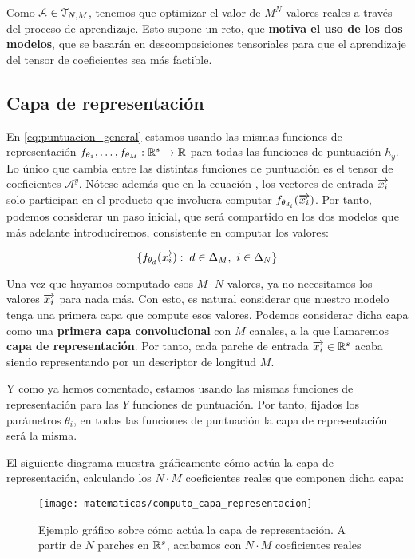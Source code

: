 \begin{observacion}
	Como $\mathcal{A} \in \mathcal{T}_{N, M}$, tenemos que optimizar el valor de $M^N$ valores reales a través del proceso de aprendizaje. Esto supone un reto, que \textbf{motiva el uso de los dos modelos}, que se basarán en descomposiciones tensoriales para que el aprendizaje del tensor de coeficientes sea más factible.
\end{observacion}

\subsection{Capa de representación} \label{subs:capa_de_representacion}

En \eqref{eq:puntuacion_general} estamos usando las mismas funciones de representación $f_{\theta_1}, \ldots, f_{\theta_M}: \mathbb{R}^s \to \mathbb{R}$ para todas las funciones de puntuación $h_y$. Lo único que cambia entre las distintas funciones de puntuación es el tensor de coeficientes $\mathcal{A}^y$. Nótese además que en la ecuación , los vectores de entrada $\overrightarrow{x_i}$ solo participan en el producto que involucra computar $f_{\theta_{d_i}}(\overrightarrow{x_i})$. Por tanto, podemos considerar un paso inicial, que será compartido en los dos modelos que más adelante introduciremos, consistente en computar los valores:

$$\{f_{\theta_d}(\overrightarrow{x_i}): \; d \in \Delta_{M},\ i \in \Delta_{N} \}$$

Una vez que hayamos computado esos $M \cdot N$ valores, ya no necesitamos los valores $\overrightarrow{x_i}$ para nada más. Con esto, es natural considerar que nuestro modelo tenga una primera capa que compute esos valores. Podemos considerar dicha capa como una \textbf{primera capa convolucional} con $M$ canales, a la que llamaremos \textbf{capa de representación}. Por tanto, cada parche de entrada $\overrightarrow{x_i} \in \mathbb{R}^s$ acaba siendo representando por un descriptor de longitud $M$.

Y como ya hemos comentado, estamos usando las mismas funciones de representación para las $Y$ funciones de puntuación. Por tanto, fijados los parámetros $\theta_i$, en todas las funciones de puntuación la capa de representación será la misma.

El siguiente diagrama muestra gráficamente cómo actúa la capa de representación, calculando los $N \cdot M$ coeficientes reales que componen dicha capa:

\begin{figure}[!hbtp]
	\centering
	\texttt{[image: matematicas/computo\_capa\_representacion]}
	\caption{Ejemplo gráfico sobre cómo actúa la capa de representación. A partir de $N$ parches en $\mathbb{R}^s$, acabamos con $N \cdot M$ coeficientes reales}
\end{figure}


